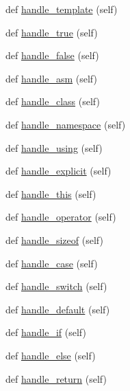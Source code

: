 \begin{DoxyCompactItemize}
\item 
def \hyperlink{classcpp_1_1ast_1_1_ast_builder_a0f4d74520697ec05eb6b549daada5a5d}{handle\+\_\+template} (self)
\item 
def \hyperlink{classcpp_1_1ast_1_1_ast_builder_ad480255644817388b81b05acc4aa9c9a}{handle\+\_\+true} (self)
\item 
def \hyperlink{classcpp_1_1ast_1_1_ast_builder_afe125e384026baf74b55593b254fc10c}{handle\+\_\+false} (self)
\item 
def \hyperlink{classcpp_1_1ast_1_1_ast_builder_acf6ec42d567cd85a9bad77772c381a4e}{handle\+\_\+asm} (self)
\item 
def \hyperlink{classcpp_1_1ast_1_1_ast_builder_a93bd39632593bec36972355b7e1893e0}{handle\+\_\+class} (self)
\item 
def \hyperlink{classcpp_1_1ast_1_1_ast_builder_ae6dde01c5f9ac7ba3b14dff01cac66e4}{handle\+\_\+namespace} (self)
\item 
def \hyperlink{classcpp_1_1ast_1_1_ast_builder_a785563f31bc3ed9559d9ce2854a83f1b}{handle\+\_\+using} (self)
\item 
def \hyperlink{classcpp_1_1ast_1_1_ast_builder_a568860050542b53d3df9cf479f2a5e1c}{handle\+\_\+explicit} (self)
\item 
def \hyperlink{classcpp_1_1ast_1_1_ast_builder_ad96a39776b5439fa9a5c2989f8da20cd}{handle\+\_\+this} (self)
\item 
def \hyperlink{classcpp_1_1ast_1_1_ast_builder_a7ca1318675b9eff41cb4a838d63eb6e6}{handle\+\_\+operator} (self)
\item 
def \hyperlink{classcpp_1_1ast_1_1_ast_builder_acfd733ff9115e3292bea10e160bb6184}{handle\+\_\+sizeof} (self)
\item 
def \hyperlink{classcpp_1_1ast_1_1_ast_builder_ac4f02e1ba7df670086e4c9dabdb21458}{handle\+\_\+case} (self)
\item 
def \hyperlink{classcpp_1_1ast_1_1_ast_builder_a1dffcdf7154158461a652c5b885bfa19}{handle\+\_\+switch} (self)
\item 
def \hyperlink{classcpp_1_1ast_1_1_ast_builder_a6bf895d948d231ffcd058df7af05d0be}{handle\+\_\+default} (self)
\item 
def \hyperlink{classcpp_1_1ast_1_1_ast_builder_a39f2561dfcf36485b2050dff258ece2b}{handle\+\_\+if} (self)
\item 
def \hyperlink{classcpp_1_1ast_1_1_ast_builder_aeb676b03467a93454be018ac243f89a2}{handle\+\_\+else} (self)
\item 
def \hyperlink{classcpp_1_1ast_1_1_ast_builder_a8330d1f34d40b0e82495ec794575289d}{handle\+\_\+return} (self)

\end{DoxyCompactItemize}
